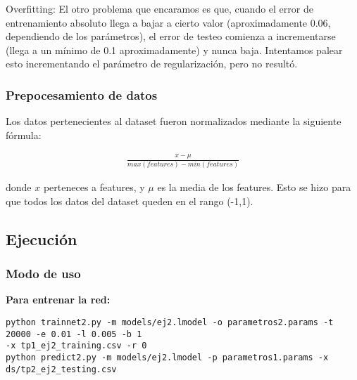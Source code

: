 Overfitting: El otro problema que encaramos es que, cuando el error de entrenamiento absoluto llega a bajar a cierto valor (aproximadamente 0.06, dependiendo de los parámetros), 
el error de testeo comienza a incrementarse (llega a un mínimo de 0.1 aproximadamente) y nunca baja. Intentamos palear esto incrementando el parámetro de regularización, pero no resultó.

\subsubsection{Prepocesamiento de datos}

Los datos pertenecientes al dataset fueron normalizados mediante la siguiente fórmula: 

\begin{align*}
		\frac{x - \mu}{max(features) - min(features)} 
\end{align*}

donde $x$ perteneces a features, y $\mu$ es la media de los features. Esto se hizo para que todos los datos  del dataset queden en el rango (-1,1).



\subsection{Ejecución}

\subsubsection{Modo de uso}

\textbf{Para entrenar la red:}

\noindent\texttt{\scriptsize{python trainnet2.py -m models/ej2.lmodel -o parametros2.params -t 20000 -e 0.01 -l 0.005 -b 1}} \\

\texttt{\scriptsize{-x tp1\_ej2\_training.csv -r 0}} \\

\noindent\texttt{\scriptsize{python predict2.py -m models/ej2.lmodel -p parametros1.params -x ds/tp2\_ej2\_testing.csv}} \\

